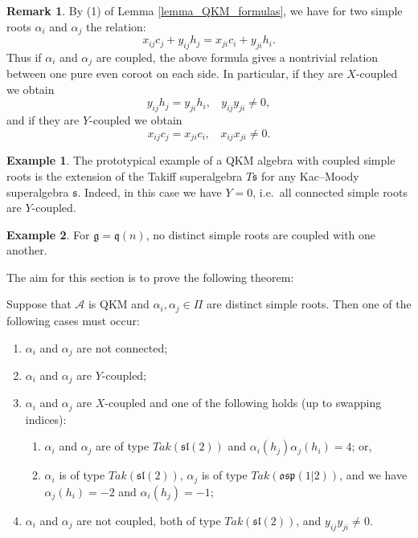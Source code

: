 \documentclass[12pt, a4paper, reqno]{amsart}
\def\AA{\mathcal{A}}
\def\p{\mathfrak{p}}
\def\q{\mathfrak{q}}
\def\g{\mathfrak{g}}
\def\l{\mathfrak{l}}
\def\s{\mathfrak{s}}
\def\o{\mathfrak{o}}
\theoremstyle{definition}
\theoremstyle{definition}
\newtheorem{remark}{Remark}
\theoremstyle{definition}
\newtheorem{example}{Example}}
\numberwithin{theorem}{section}
\numberwithin{lemma}{section}
\numberwithin{remark}{section}
\numberwithin{definition}{section}
\numberwithin{corollary}{section}
\numberwithin{proposition}{section}
\numberwithin{example}{section}
\begin{document}
	\begin{remark}\label{remark_coroot_coupling}
		By (1) of Lemma \ref{lemma_QKM_formulas}, we have for two simple roots $\alpha_i$ and $\alpha_j$ the relation:
		\[
		x_{ij}c_j+y_{ij}h_j = x_{ji}c_i+y_{ji}h_i.
		\]
		Thus if $\alpha_i$ and $\alpha_j$ are coupled, the above formula gives a nontrivial relation between one pure even coroot on each side.  In particular, if they are $X$-coupled we obtain 
		\[
		y_{ij}h_j=y_{ji}h_i, \ \ \ \ y_{ij}y_{ji}\neq0,
		\]
		and if they are $Y$-coupled we obtain
		\[
		x_{ij}c_j=x_{ji}c_i, \ \ \ \ x_{ij}x_{ji}\neq0.	 
		\]
	\end{remark}
	
	\begin{example}
		The prototypical example of a QKM algebra with coupled simple roots is the extension of the Takiff superalgebra $T\s$ for any Kac--Moody superalgebra $\s$.  Indeed, in this case we have $Y=0$, i.e.~all connected simple roots are $Y$-coupled.
	\end{example}
	
	\begin{example}
		For $\g=\q(n)$, no distinct simple roots are coupled with one another.
	\end{example}
	
	The aim for this section is to prove the following theorem:
	
	\begin{theorem}\label{theorem_coupling}
		Suppose that $\AA$ is QKM and $\alpha_i,\alpha_j\in\Pi$ are distinct simple roots.  Then one of the following cases must occur:
		\begin{enumerate}
			\item $\alpha_i$ and $\alpha_j$ are not connected;
			\item $\alpha_i$ and $\alpha_j$ are $Y$-coupled;
			\item $\alpha_i$ and $\alpha_j$ are $X$-coupled and one of the following holds (up to swapping indices):
			\begin{enumerate}
				\item $\alpha_i$ and $\alpha_j$ are of type $Tak(\s\l(2))$ and $\alpha_i(h_j)\alpha_j(h_i)=4$; or,
				\item $\alpha_i$ is of type $Tak(\s\l(2))$, $\alpha_j$ is of type $Tak(\o\s\p(1|2))$, and we have \linebreak $\alpha_j(h_i)=-2$ and $\alpha_i(h_j)=-1$;
			\end{enumerate}
			\item $\alpha_i$ and $\alpha_j$ are not coupled, both of type $Tak(\s\l(2))$, and $y_{ij}y_{ji}\neq0$.
		\end{enumerate}
	\end{theorem}
	
\end{document}
